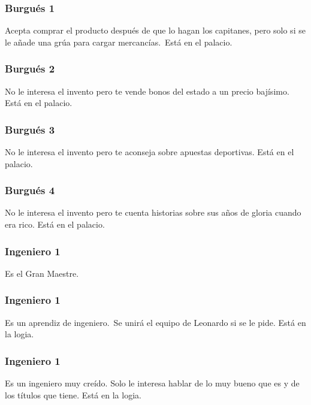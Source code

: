 \subsubsection[Burgu\'es 1]{ Burgu\'es 1}
\hypertarget{Toc484614238}{}{
Acepta comprar el producto despu\'es de que lo hagan los capitanes, pero solo si se le a\~nade una gr\'ua para cargar
mercanc\'ias.\ Est\'a en el palacio.}

\subsubsection[Burgu\'es 2]{ Burgu\'es 2}
\hypertarget{Toc484614239}{}{
No le interesa el invento pero te vende bonos del estado a un precio baj\'isimo. Est\'a en el palacio.}

\subsubsection[Burgu\'es 3]{ Burgu\'es 3}
\hypertarget{Toc484614240}{}{
No le interesa el invento pero te aconseja sobre apuestas deportivas. Est\'a en el palacio.}

\subsubsection[Burgu\'es 4]{ Burgu\'es 4}
\hypertarget{Toc484614241}{}{
No le interesa el invento pero te cuenta historias sobre sus a\~nos de gloria cuando era rico. Est\'a en el palacio.}

\subsubsection[Ingeniero 1]{ Ingeniero 1}
\hypertarget{Toc484614242}{}{
Es el Gran Maestre.\ }

\subsubsection[Ingeniero 1]{ Ingeniero 1}
\hypertarget{Toc484614243}{}{
Es un aprendiz de ingeniero.\ Se unir\'a el equipo de Leonardo si se le pide. Est\'a en la logia.}

\subsubsection[Ingeniero 1]{ Ingeniero 1}
\hypertarget{Toc484614244}{}{
Es un ingeniero muy cre\'ido. Solo le interesa hablar de lo muy bueno que es y de los t\'itulos que tiene. Est\'a en la
logia.}


